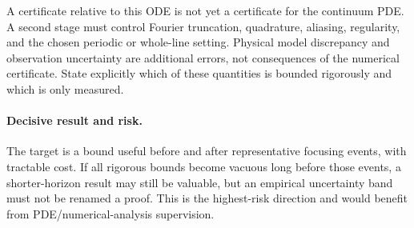 A certificate relative to this ODE is not yet a certificate for the
continuum PDE. A second stage must control Fourier truncation, quadrature,
aliasing, regularity, and the chosen periodic or whole-line setting.
Physical model discrepancy and observation uncertainty are additional
errors, not consequences of the numerical certificate. State explicitly
which of these quantities is bounded rigorously and which is only measured.

\paragraph{Decisive result and risk.}
The target is a bound useful before and after representative focusing
events, with tractable cost. If all rigorous bounds become vacuous long
before those events, a shorter-horizon result may still be valuable, but
an empirical uncertainty band must not be renamed a proof. This is the
highest-risk direction and would benefit from PDE/numerical-analysis
supervision.
